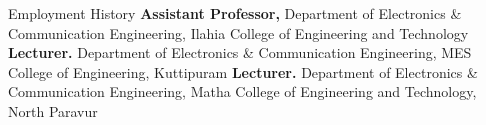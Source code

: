 \begin{rubric}{Employment History}
%
	\textbf{Assistant Professor,} Department of Electronics \& Communication Engineering, Ilahia College of Engineering and Technology
%
%
%
	\textbf{Lecturer.} Department of Electronics \& Communication Engineering, MES College of Engineering, Kuttipuram
%
%
	\textbf{Lecturer.} Department of Electronics \& Communication Engineering, Matha College of Engineering and Technology, North Paravur
\end{rubric}